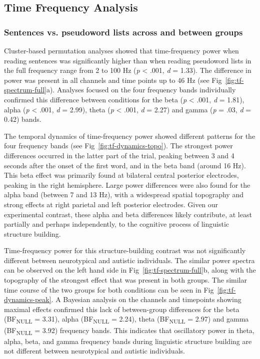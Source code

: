 \subsection{Time Frequency Analysis}
\subsubsection{Sentences vs. pseudoword lists across and between groups}
Cluster-based permutation analyses showed that time-frequency power when reading sentences was significantly higher than when reading pseudoword lists in the full frequency range from 2 to 100 Hz (\textit{p} <  .001, \textit{d} = 1.33). The difference in power was present in all channels and time points up to 46 Hz (see Fig~\ref{fig:tf-spectrum-full}a). Analyses focused on the four frequency bands individually confirmed this difference between conditions for the beta (\textit{p} <  .001, \textit{d} = 1.81), alpha (\textit{p} <  .001, \textit{d} = 2.99), theta (\textit{p} <  .001, \textit{d} = 2.27) and gamma (\textit{p} = .03, \textit{d} = 0.42) bands.



The temporal dynamics of time-frequency power showed different patterns for the four frequency bands (see Fig~\ref{fig:tf-dynamics-topo}). The strongest power differences occurred in the latter part of the trial, peaking between 3 and 4 seconds after the onset of the first word, and in the beta band (around 16 Hz). This beta effect was primarily found at bilateral central posterior electrodes, peaking in the right hemisphere. Large power differences were also found for the alpha band (between 7 and 13 Hz), with a widespread spatial topography and strong effects at right parietal and left posterior electrodes. Given our experimental contrast, these alpha and beta differences likely contribute, at least partially and perhaps independently, to the cognitive process of linguistic structure building. 



Time-frequency power for this structure-building contrast was not significantly different between neurotypical and autistic individuals. The similar power spectra can be observed on the left hand side in Fig~\ref{fig:tf-spectrum-full}b, along with the topography of the strongest effect that was present in both groups. The similar time course of the two groups for both conditions can be seen in Fig~\ref{fig:tf-dynamics-peak}. A Bayesian analysis on the channels and timepoints showing maximal effects confirmed this lack of between-group differences for the beta (BF\textsubscript{NULL} = 3.31), alpha (BF\textsubscript{NULL} = 2.24), theta (BF\textsubscript{NULL} = 2.97) and gamma (BF\textsubscript{NULL} = 3.92) frequency bands. This indicates that oscillatory power in theta, alpha, beta, and gamma frequency bands during linguistic structure building are not different between neurotypical and autistic individuals. 

